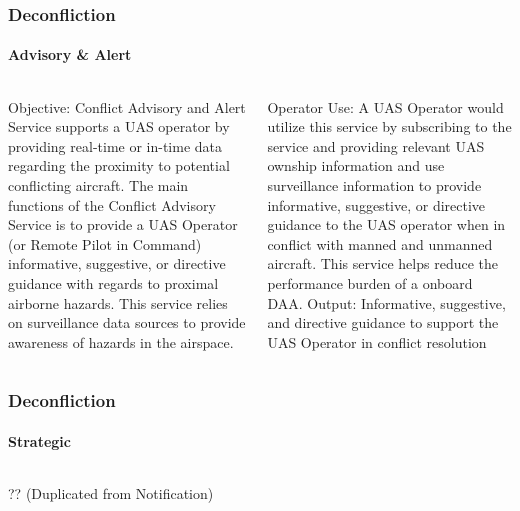 \documentclass[usenames,dvipsnames,aspectratio=169,serif]{beamer}
\begin{document}
\begin{frame}
   \frametitle{Deconfliction}
   \framesubtitle{Advisory \& Alert}
   \begin{columns}[t]
      \begin{column}{0.5\textwidth}
         Objective: Conflict Advisory and Alert Service supports a UAS operator by providing real-time or in-time data regarding the proximity to potential conflicting aircraft. The main functions of the Conflict Advisory Service is to provide a UAS Operator (or Remote Pilot in Command) informative, suggestive, or directive guidance with regards to proximal airborne hazards. This service relies on surveillance data sources to provide awareness of hazards in the airspace.
      \end{column}
      \begin{column}{0.5\textwidth}
         Operator Use: A UAS Operator would utilize this service by subscribing to the service and providing relevant UAS ownship information and use surveillance information to provide informative, suggestive, or directive guidance to the UAS operator when in conflict with manned and unmanned aircraft. This service helps reduce the performance burden of a onboard DAA.
         Output: Informative, suggestive, and directive guidance to support the UAS Operator in conflict resolution
      \end{column}
   \end{columns}
\end{frame}

\begin{frame}
   \frametitle{Deconfliction}
   \framesubtitle{Strategic}
   \begin{columns}[t]
      \begin{column}{0.5\textwidth}
         ?? (Duplicated from Notification)
      \end{column}
      \begin{column}{0.5\textwidth}
      \end{column}
   \end{columns}
\end{frame}
\end{document}
